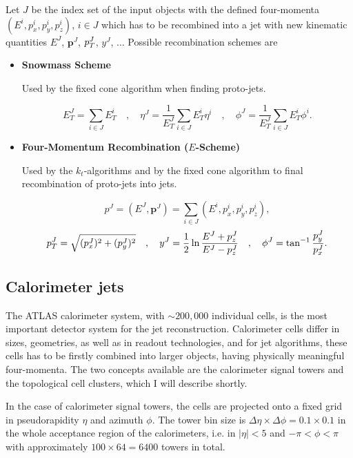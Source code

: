 Let $J$ be the index set of the input objects with the defined four-momenta
$(E^i,p_x^i,p_y^i,p_z^i)$, $i \in J$ which has to be recombined into a jet
with new kinematic quantities $E^J$, $\mathbf{p}^J$, $p_{T}^J$, $y^J$, $\ldots$
Possible recombination schemes are

\begin{itemize}
\item \textbf{Snowmass Scheme}

Used by the fixed cone algorithm when finding proto-jets.

\begin{equation}
  E_T^J = \sum_{i \in J} E_T^i
  \quad , \quad
  \eta^J = \frac{1}{E_T^J} \sum_{i \in J} E_T^i \eta^i
  \quad , \quad
  \phi^J = \frac{1}{E_T^J} \sum_{i \in J} E_T^i \phi^i.
\end{equation}

\item \textbf{Four-Momentum Recombination ($E$-Scheme)}

Used by the $k_t$-algorithms and by the fixed cone algorithm to final recombination of
proto-jets into jets.

\begin{equation}
  p^J = ( E^J, \mathbf{p}^J ) = \sum_{i \in J} (E^i,p_x^i,p_y^i,p_z^i),
\end{equation}
\begin{equation}
  p_{T}^J = \sqrt{(p_x^J)^2 + (p_y^J)^2}
  \quad , \quad
  y^J = \frac{1}{2} \ln \frac{E^J + p_z^J}{E^J - p_z^J}
  \quad , \quad
  \phi^J = \tan^{-1} \frac{p_y^J}{p_x^J}.
\end{equation}
\end{itemize}

\subsection{Calorimeter jets}
\label{sse:CalorimeterJets}

The ATLAS calorimeter system, with $\sim 200,000$ individual cells, is the most
important detector system for the jet reconstruction. Calorimeter cells differ
in sizes, geometries, as well as in readout technologies, and for jet algorithms,
these cells has to be firstly combined into larger objects, having physically
meaningful four-momenta. The two concepts available are the calorimeter signal
towers and the topological cell clusters, which I will describe shortly.

In the case of calorimeter signal towers, the cells are projected onto a fixed
grid in pseudorapidity $\eta$ and azimuth $\phi$. The tower bin size is $\Delta
\eta \times \Delta \phi = 0.1 \times 0.1$ in the whole acceptance region of the
calorimeters, i.e. in $|\eta| < 5$ and $- \pi < \phi < \pi$ with approximately 
$100 \times 64 = 6400$ towers in total.

